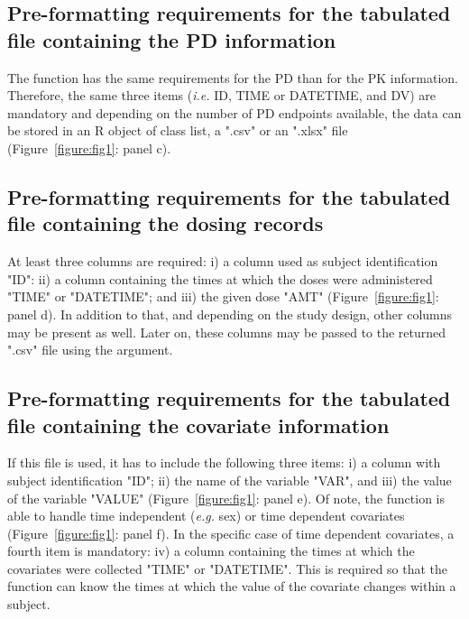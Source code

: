 \subsection{Pre-formatting requirements for the tabulated file containing the PD information}

The  function has the same requirements for the PD than for the PK information. Therefore, the same three items (\textit{i.e.} ID, TIME or DATETIME, and DV) are mandatory and depending on the number of PD endpoints available, the data can be stored in an R object of class list, a ".csv" or an ".xlsx" file (Figure~\ref{figure:fig1}: panel c). 

\subsection{Pre-formatting requirements for the tabulated file containing the dosing records}
At least three columns are required: i) a column used as subject identification "ID": ii) a column containing the times at which the doses were administered "TIME" or "DATETIME"; and iii) the given dose "AMT" (Figure~\ref{figure:fig1}: panel d). In addition to that, and depending on the study design, other columns may be present as well. Later on, these columns may be passed to the returned ".csv" file using the  argument.


\subsection{Pre-formatting requirements for the tabulated file containing the covariate information}

If this file is used, it has to include the following three items: i) a column with subject identification "ID"; ii) the name of the variable "VAR", and iii) the value of the variable "VALUE" (Figure~\ref{figure:fig1}: panel e). Of note, the  function is able to handle time independent (\textit{e.g.} sex) or time dependent covariates (Figure~\ref{figure:fig1}: panel f). In the specific case of time dependent covariates, a fourth item is mandatory: iv) a column containing the times at which the covariates were collected "TIME" or "DATETIME". This is required so that the   function can know the times at which the value of the covariate changes within a subject.



